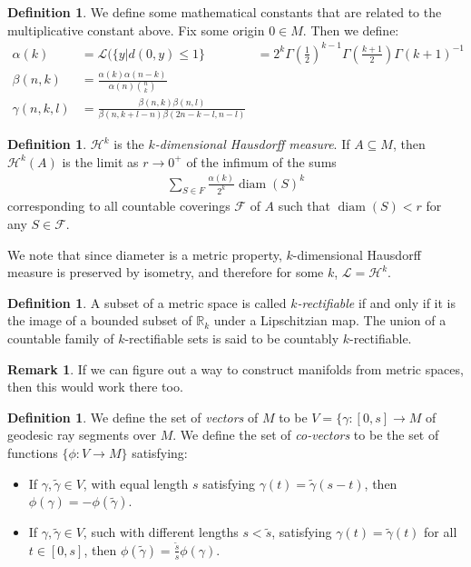 \documentclass{article}
\theoremstyle{plain}
\theoremstyle{definition}
\newtheorem{defn}[thm]{Definition}
\newtheorem{rem}[thm]{Remark}
\renewcommand{\(}{\left(}
\renewcommand{\)}{\right)}
\newcommand{\R}{\mathbb R}
\DeclareMathOperator{\diam}{diam}
\begin{document}
\begin{defn}
  We define some mathematical constants that are related to the multiplicative constant above. Fix some origin $0 \in M$. Then we define:
  \begin{align*}
       \alpha(k) &= \mathcal L(\{y \vert d(0,y) \leq 1\} &= 2^k\Gamma\left(\frac{1}{2}\right)^{k-1}\Gamma\left(\frac{k+1}{2}\right)\Gamma(k+1)^{-1}
    \\ \beta(n,k) &= \frac{\alpha(k)\alpha(n-k)}{\alpha(n)\binom{n}{k}}
    \\ \gamma(n,k,l) &= \frac{\beta(n,k)\beta(n,l)}{\beta(n,k+l-n)\beta(2n-k-l,n-l)}
  \end{align*}
\end{defn}
\begin{defn}
  $\mathcal H^k$ is the \emph{$k$-dimensional Hausdorff measure}. If $A \subseteq M$, then $\mathcal H^k(A)$ is the limit as $r \rightarrow 0^{+}$ of the infimum of the sums
  \begin{align*}
    \sum_{S \in F} \frac{\alpha(k)}{2^{k}} \diam(S)^k
  \end{align*}
  corresponding to all countable coverings $\mathcal F$ of $A$ such that $\diam(S) < r$ for any $S \in \mathcal F$.

  We note that since diameter is a metric property, $k$-dimensional Hausdorff measure is preserved by isometry, and therefore for some $k$, $\mathcal L = \mathcal H^k$.
\end{defn}
\begin{defn}
A subset of a metric space is called \emph{$k$-rectifiable} if and only if it is the image of a bounded subset of $\R_k$ under a Lipschitzian map.
The union of a countable family of $k$-rectifiable sets is said to be countably $k$-rectifiable.
\end{defn}
\begin{rem}
  If we can figure out a way to construct manifolds from metric spaces, then this would work there too.
\end{rem}
\begin{defn}
  We define the set of \emph{vectors} of $M$ to be $V = \{\gamma : [0,s] \rightarrow M$ of geodesic ray segments over $M$.
  We define the set of \emph{co-vectors} to be the set of functions $\{\phi : V \rightarrow M\}$ satisfying:
  \begin{itemize}
  \item If $\gamma,\tilde \gamma \in V$, with equal length $s$ satisfying $\gamma(t) = \tilde \gamma(s-t)$, then $\phi(\gamma) = - \phi(\tilde \gamma)$.
  \item If $\gamma, \tilde \gamma \in V$, such with different lengths $s < \tilde s$, satisfying $\gamma(t) = \tilde \gamma(t)$ for all $t \in [0,s]$, then $\phi(\tilde \gamma) = \frac{\tilde s}{s} \phi(\gamma)$.
  \end{itemize}

\end{defn}
\end{document}
